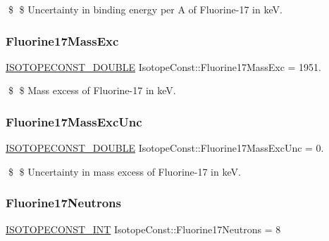 \$ \$ Uncertainty in binding energy per A of Fluorine-\/17 in keV. \mbox{\label{group___isotope_const-_fluorine-_f17_ga32820265020843122dfb8abc9ac35c36}} 
\subsubsection{\texorpdfstring{Fluorine17\+Mass\+Exc}{Fluorine17MassExc}}
{\footnotesize\ttfamily \mbox{\hyperlink{group___isotope_const-_macros_ga8f45a7272ce02c0b4c65c44636ed719a}{I\+S\+O\+T\+O\+P\+E\+C\+O\+N\+S\+T\+\_\+\+D\+O\+U\+B\+LE}} Isotope\+Const\+::\+Fluorine17\+Mass\+Exc = 1951.}

\$ \$ Mass excess of Fluorine-\/17 in keV. \mbox{\label{group___isotope_const-_fluorine-_f17_gabbba404031739de48b4de1f1b3b0aca2}} 
\subsubsection{\texorpdfstring{Fluorine17\+Mass\+Exc\+Unc}{Fluorine17MassExcUnc}}
{\footnotesize\ttfamily \mbox{\hyperlink{group___isotope_const-_macros_ga8f45a7272ce02c0b4c65c44636ed719a}{I\+S\+O\+T\+O\+P\+E\+C\+O\+N\+S\+T\+\_\+\+D\+O\+U\+B\+LE}} Isotope\+Const\+::\+Fluorine17\+Mass\+Exc\+Unc = 0.}

\$ \$ Uncertainty in mass excess of Fluorine-\/17 in keV. \mbox{\label{group___isotope_const-_fluorine-_f17_ga1022e3599f1eab16a3559970a6fa4c7f}} 
\subsubsection{\texorpdfstring{Fluorine17\+Neutrons}{Fluorine17Neutrons}}
{\footnotesize\ttfamily \mbox{\hyperlink{group___isotope_const-_macros_ga5f18360b3e99483a35c32d789e62621c}{I\+S\+O\+T\+O\+P\+E\+C\+O\+N\+S\+T\+\_\+\+I\+NT}} Isotope\+Const\+::\+Fluorine17\+Neutrons = 8}

